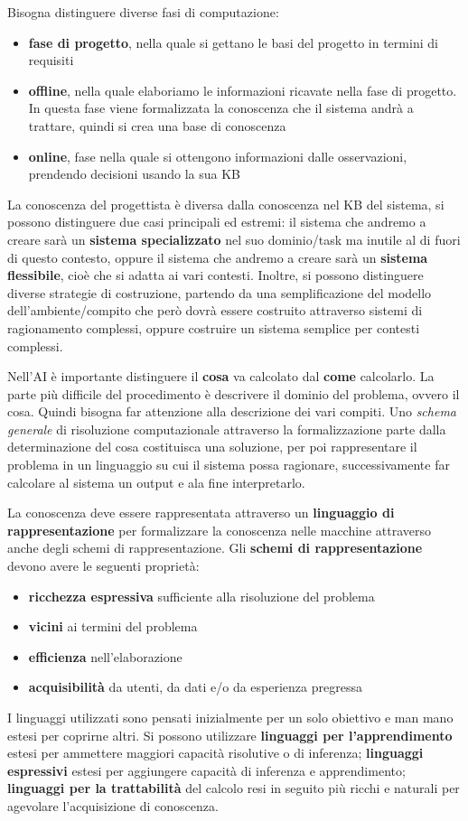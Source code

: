 \documentclass[a4paper]{extarticle}
\begin{document}
Bisogna distinguere diverse fasi di computazione:
\begin{itemize}
\item \textbf{fase di progetto}, nella quale si gettano le basi del progetto in termini di requisiti
\item \textbf{offline}, nella quale elaboriamo le informazioni ricavate nella fase di progetto. In questa fase viene formalizzata la conoscenza che il sistema andrà a trattare, quindi si crea una base di conoscenza
\item \textbf{online}, fase nella quale si ottengono informazioni dalle osservazioni, prendendo decisioni usando la sua KB
\end{itemize}
La conoscenza del progettista è diversa dalla conoscenza nel KB del sistema, si possono distinguere due casi principali ed estremi: il sistema che andremo a creare sarà un \textbf{sistema specializzato} nel suo dominio/task ma inutile al di fuori di questo contesto, oppure il sistema che andremo a creare sarà un \textbf{sistema flessibile}, cioè che si adatta ai vari contesti. Inoltre, si possono distinguere diverse strategie di costruzione, partendo da una semplificazione del modello dell'ambiente/compito che però dovrà essere costruito attraverso sistemi di ragionamento complessi, oppure costruire un sistema semplice per contesti complessi.

Nell'AI è importante distinguere il \textbf{cosa} va calcolato dal \textbf{come} calcolarlo. La parte più difficile del procedimento è descrivere il dominio del problema, ovvero il cosa. Quindi bisogna far attenzione alla descrizione dei vari compiti. Uno \textit{schema generale} di risoluzione computazionale attraverso la formalizzazione parte dalla determinazione del cosa costituisca una soluzione, per poi rappresentare il problema in un linguaggio su cui il sistema possa ragionare, successivamente far calcolare al sistema un output e ala fine interpretarlo.

La conoscenza deve essere rappresentata attraverso un \textbf{linguaggio di rappresentazione} per formalizzare la conoscenza nelle macchine attraverso anche degli schemi di rappresentazione. Gli \textbf{schemi di rappresentazione} devono avere le seguenti proprietà:
\begin{itemize}
\item \textbf{ricchezza espressiva} sufficiente alla risoluzione del problema
\item \textbf{vicini} ai termini del problema
\item \textbf{efficienza} nell'elaborazione
\item \textbf{acquisibilità} da utenti, da dati e/o da esperienza pregressa
\end{itemize}
I linguaggi utilizzati sono pensati inizialmente per un solo obiettivo e man mano estesi per coprirne altri. Si possono utilizzare \textbf{linguaggi per l'apprendimento} estesi per ammettere maggiori capacità risolutive o di inferenza; \textbf{linguaggi espressivi} estesi per aggiungere capacità di inferenza e apprendimento; \textbf{linguaggi per la trattabilità} del calcolo resi in seguito più ricchi e naturali per agevolare l'acquisizione di conoscenza. 
\end{document}

